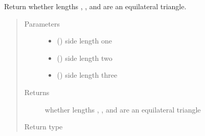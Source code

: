 \documentclass[letterpaper,10pt,english]{sphinxmanual}
\begin{document}
\begin{fulllineitems}
\label{\detokenize{api:trianglelib.utils.is_equilateral}}
Return whether lengths , , and  are an equilateral triangle.
\begin{quote}\begin{description}
\item[{Parameters}] \leavevmode\begin{itemize}
\item {} 
 () \textendash{} side length one

\item {} 
 () \textendash{} side length two

\item {} 
 () \textendash{} side length three

\end{itemize}

\item[{Returns}] \leavevmode
whether lengths , , and  are an equilateral triangle

\item[{Return type}] \leavevmode
{}

\end{description}\end{quote}

\end{fulllineitems}

\end{document}
